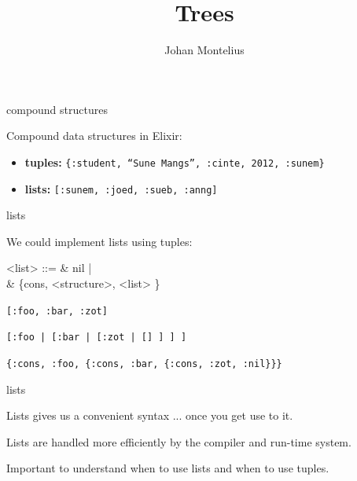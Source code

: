 

\title[ID1019 Trees]{Trees}


\author{Johan Montelius}
\date{\semester}



\begin{frame}
\titlepage
\end{frame}

\begin{frame}{compound structures}

Compound data structures in Elixir:

\begin{itemize}
 \item {\bf tuples:} {\tt \{:student, ``Sune Mangs'', :cinte, 2012,  :sunem\}}
 \item {\bf lists:} {\tt [:sunem, :joed, :sueb, :anng]}
\end{itemize}
\end{frame}


\begin{frame}{lists}

We could implement lists using tuples:

\pause

\begin{code}
   <list> ::=  & nil | \\
               & \{cons, <structure>, <list> \}
\end{code}


\pause \vspace{20pt}
{\tt [:foo, :bar, :zot]}

\pause \vspace{10pt}
{\tt [:foo | [:bar | [:zot | [] ] ] ] }

\pause \vspace{10pt}
{\tt \{:cons, :foo, \{:cons, :bar, \{:cons, :zot, :nil\}\}\}}

\end{frame}


\begin{frame}{lists}

\pause Lists gives us a convenient syntax ... \pause once you get use to it.
\vspace{20pt}

\pause Lists are handled more efficiently by the compiler and run-time system.

\vspace{20pt}
\pause Important to understand when to use lists and when to use tuples.

\end{frame}

